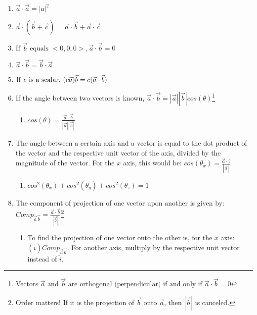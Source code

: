 \documentclass[12pt]{article}
\begin{document}
\begin{enumerate}

  \item $\vec{a}\cdot\vec{a}=|a|^2$

  \item $\vec{a}\cdot(\vec{b}+\vec{c}) = \vec{a}\cdot\vec{b}+\vec{a}\cdot\vec{c}$

  \item $\text{If } \vec{b} \text{ equals } <0, 0, 0>, \vec{a}\cdot\vec{b}=0$

  \item $\vec{a}\cdot\vec{b}=\vec{b}\cdot\vec{a}$

  \item $\text{If \textit{c} is a scalar, } (c\vec{a})\vec{b}=c(\vec{a}\cdot\vec{b})$

  \item If the angle between two vectors is known, $\vec{a}\cdot\vec{b}=|\vec{a}||\vec{b}|cos(\theta)$\footnote{Vectors $\vec{a} \text{ and } \vec{b} \text{ are orthogonal (perpendicular) if and only if }\vec{a}\cdot\vec{b}=0$}

    \begin{enumerate}

      \item $cos(\theta)=\frac{\vec{a}\cdot\vec{b}}{|\vec{a}||\vec{b}|}$

    \end{enumerate}

  \item The angle between a certain axis and a vector is equal to the dot product of the vector and the respective unit vector of the axis, divided by the magnitude of the vector. For the $x$ axis, this would be: $cos(\theta_x)=\frac{\vec{a}\cdot i}{|\vec{a}|}$

    \begin{enumerate}

      \item $cos^2(\theta_x) + cos^2(\theta_y) + cos^2(\theta_z) = 1$

    \end{enumerate}

  \item The component of projection of one vector upon another is given by: $Comp_{\vec{a}\vec{b}} = \frac{\vec{a}\cdot\vec{b}}{|\vec{b}|}$\footnote{Order matters! If it is the projection of $\vec{b} \text{ onto } \vec{a}$, then $|\vec{b}|$ is canceled.}

    \begin{enumerate}

      \item To find the projection of one vector onto the other is, for the $x$ axis: $(\hat{i})Comp_{\vec{a}\vec{b}}$. For another axis, multiply by the respective unit vector instead of $\hat{i}$.

    \end{enumerate}
\end{enumerate}
\end{document}
